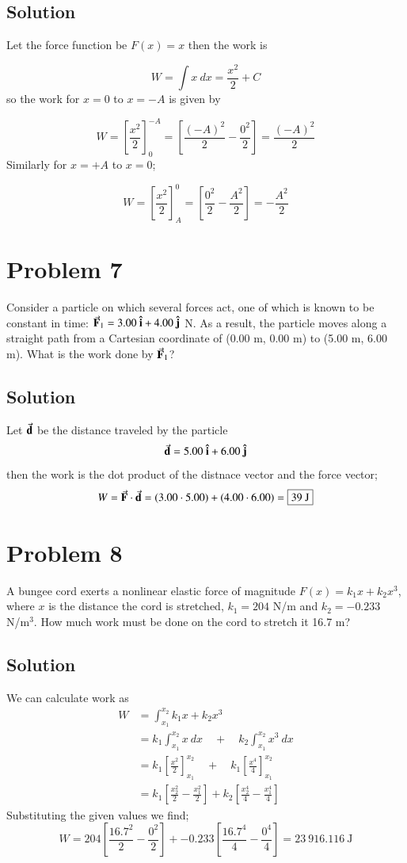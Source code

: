 \documentclass{article}
\begin{document}
\subsection*{Solution}

Let the force function be $F(x) = x$ then the work is

\[
	W = \int x\ dx = \frac{x^2}{2} + C
\]
so
the work for $x = 0$ to $x = -A$ is given by

\[
	W = \left[ \frac{x^2}{2}\right]_{0}^{-A} = \left[ \frac{(-A)^2}{2} - \frac{0^2}{2} \right] = \boxed{\frac{(-A)^2}{2}}
\]
Similarly for $x = +A$ to $x = 0$;

\[
	W = \left[ \frac{x^2}{2} \right]_{A}^{0} = \left[ \frac{0^2}{2} - \frac{A^2}{2} \right] = \boxed{-\frac{A^2}{2}}
\]


\section*{Problem 7}
Consider a particle on which several forces act, one of which is known to be constant in time:
$\va{F}_1 = 3.00\ \vu{i} + 4.00\ \vu{j}$ N. As a result, the particle moves along a straight path from a Cartesian coordinate of
(0.00 m, 0.00 m) to (5.00 m, 6.00 m). What is the work done by $\va{F}_1$?

\subsection*{Solution}
Let $\va{d}$ be the distance traveled by the particle
\[
	\va{d} = 5.00\ \vu i + 6.00\ \vu j
\]
then the work is the dot product of the distnace vector and the force vector;
\[
	W = \va F \cdot \va d = (3.00 \cdot 5.00) + (4.00 \cdot 6.00) = \boxed{39\ \text{J}}
\]

\section*{Problem 8}
A bungee cord exerts a nonlinear elastic force of magnitude $F(x) = k_1 x + k_2 x^3$, where $x$ is the distance the cord is stretched, $k_1 = 204$ N/m and $k_2 = -0.233$ N/m$^3$. How much work must be done on the cord to stretch it 16.7 m?

\subsection*{Solution}
We can calculate work as
\begin{align*}
	W &= \int_{x_1}^{x_2} k_1 x + k_2 x^3 \\
	  &= k_1 \int_{x_1}^{x_2} x\ dx \quad + \quad k_2 \int_{x_1}^{x_2} x^3\ dx \\
	  &= k_1\left[ \frac{x^2}{2} \right]_{x_1}^{x_2} \quad + \quad k_1\left[ \frac{x^4}{4} \right]_{x_1}^{x_2} \\
	  &= k_1 \left[ \frac{x_2^2}{2} - \frac{x_1^2}{2} \right] + k_2 \left[ \frac{x_2^4}{4} - \frac{x_1^4}{4} \right]
\end{align*}
Substituting the given values we find;
\[
	W = 204 \left[ \frac{16.7^2}{2} - \frac{0^2}{2} \right] + -0.233 \left[ \frac{16.7^4}{4} - \frac{0^4}{4} \right] = \boxed{23\ 916.116\ \text{J}}
\]
\end{document}
